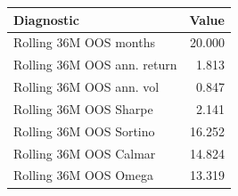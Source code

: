 \begin{tabular}{lr}
\toprule
Diagnostic & Value \\
\midrule
Rolling 36M OOS months & 20.000 \\
Rolling 36M OOS ann. return & 1.813 \\
Rolling 36M OOS ann. vol & 0.847 \\
Rolling 36M OOS Sharpe & 2.141 \\
Rolling 36M OOS Sortino & 16.252 \\
Rolling 36M OOS Calmar & 14.824 \\
Rolling 36M OOS Omega & 13.319 \\
\bottomrule
\end{tabular}
